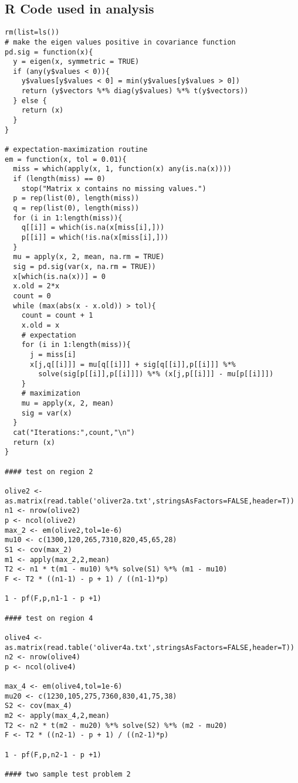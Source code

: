 \documentclass[11pt]{article}
\begin{document}
\subsection*{R Code used in analysis}

\begin{verbatim}
rm(list=ls())
# make the eigen values positive in covariance function
pd.sig = function(x){
  y = eigen(x, symmetric = TRUE)
  if (any(y$values < 0)){
    y$values[y$values < 0] = min(y$values[y$values > 0])
    return (y$vectors %*% diag(y$values) %*% t(y$vectors))
  } else {
    return (x)
  }
}

# expectation-maximization routine
em = function(x, tol = 0.01){
  miss = which(apply(x, 1, function(x) any(is.na(x))))
  if (length(miss) == 0)
    stop("Matrix x contains no missing values.")
  p = rep(list(0), length(miss))
  q = rep(list(0), length(miss))
  for (i in 1:length(miss)){
    q[[i]] = which(is.na(x[miss[i],]))
    p[[i]] = which(!is.na(x[miss[i],]))
  }
  mu = apply(x, 2, mean, na.rm = TRUE)
  sig = pd.sig(var(x, na.rm = TRUE))
  x[which(is.na(x))] = 0
  x.old = 2*x
  count = 0
  while (max(abs(x - x.old)) > tol){
    count = count + 1
    x.old = x
    # expectation
    for (i in 1:length(miss)){
      j = miss[i]
      x[j,q[[i]]] = mu[q[[i]]] + sig[q[[i]],p[[i]]] %*% 
        solve(sig[p[[i]],p[[i]]]) %*% (x[j,p[[i]]] - mu[p[[i]]])
    }
    # maximization
    mu = apply(x, 2, mean)
    sig = var(x)
  }
  cat("Iterations:",count,"\n")
  return (x)
}

#### test on region 2

olive2 <- as.matrix(read.table('oliver2a.txt',stringsAsFactors=FALSE,header=T))
n1 <- nrow(olive2)
p <- ncol(olive2)
max_2 <- em(olive2,tol=1e-6)
mu10 <- c(1300,120,265,7310,820,45,65,28)
S1 <- cov(max_2)
m1 <- apply(max_2,2,mean)
T2 <- n1 * t(m1 - mu10) %*% solve(S1) %*% (m1 - mu10)
F <- T2 * ((n1-1) - p + 1) / ((n1-1)*p)

1 - pf(F,p,n1-1 - p +1)

#### test on region 4

olive4 <- as.matrix(read.table('oliver4a.txt',stringsAsFactors=FALSE,header=T))
n2 <- nrow(olive4)
p <- ncol(olive4)

max_4 <- em(olive4,tol=1e-6)
mu20 <- c(1230,105,275,7360,830,41,75,38)
S2 <- cov(max_4)
m2 <- apply(max_4,2,mean)
T2 <- n2 * t(m2 - mu20) %*% solve(S2) %*% (m2 - mu20)
F <- T2 * ((n2-1) - p + 1) / ((n2-1)*p)

1 - pf(F,p,n2-1 - p +1)

#### two sample test problem 2


\end{verbatim}
\end{document}
